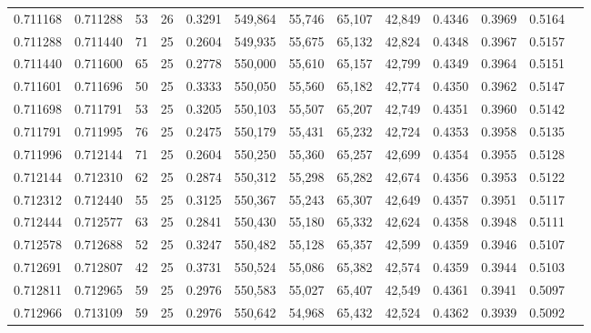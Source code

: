 \begin{tabular}{rrrrrrrrrrrrr}
0.711168 & 0.711288 &    53 &  26 &                                     0.3291 & 549,864 &  55,746 &  65,107 &  42,849 & 0.4346 & 0.3969 & 0.5164 \\
0.711288 & 0.711440 &    71 &  25 &                                     0.2604 & 549,935 &  55,675 &  65,132 &  42,824 & 0.4348 & 0.3967 & 0.5157 \\
0.711440 & 0.711600 &    65 &  25 &                                     0.2778 & 550,000 &  55,610 &  65,157 &  42,799 & 0.4349 & 0.3964 & 0.5151 \\
0.711601 & 0.711696 &    50 &  25 &                                     0.3333 & 550,050 &  55,560 &  65,182 &  42,774 & 0.4350 & 0.3962 & 0.5147 \\
0.711698 & 0.711791 &    53 &  25 &                                     0.3205 & 550,103 &  55,507 &  65,207 &  42,749 & 0.4351 & 0.3960 & 0.5142 \\
0.711791 & 0.711995 &    76 &  25 &                                     0.2475 & 550,179 &  55,431 &  65,232 &  42,724 & 0.4353 & 0.3958 & 0.5135 \\
0.711996 & 0.712144 &    71 &  25 &                                     0.2604 & 550,250 &  55,360 &  65,257 &  42,699 & 0.4354 & 0.3955 & 0.5128 \\
0.712144 & 0.712310 &    62 &  25 &                                     0.2874 & 550,312 &  55,298 &  65,282 &  42,674 & 0.4356 & 0.3953 & 0.5122 \\
0.712312 & 0.712440 &    55 &  25 &                                     0.3125 & 550,367 &  55,243 &  65,307 &  42,649 & 0.4357 & 0.3951 & 0.5117 \\
0.712444 & 0.712577 &    63 &  25 &                                     0.2841 & 550,430 &  55,180 &  65,332 &  42,624 & 0.4358 & 0.3948 & 0.5111 \\
0.712578 & 0.712688 &    52 &  25 &                                     0.3247 & 550,482 &  55,128 &  65,357 &  42,599 & 0.4359 & 0.3946 & 0.5107 \\
0.712691 & 0.712807 &    42 &  25 &                                     0.3731 & 550,524 &  55,086 &  65,382 &  42,574 & 0.4359 & 0.3944 & 0.5103 \\
0.712811 & 0.712965 &    59 &  25 &                                     0.2976 & 550,583 &  55,027 &  65,407 &  42,549 & 0.4361 & 0.3941 & 0.5097 \\
0.712966 & 0.713109 &    59 &  25 &                                     0.2976 & 550,642 &  54,968 &  65,432 &  42,524 & 0.4362 & 0.3939 & 0.5092 \\

\end{tabular}
